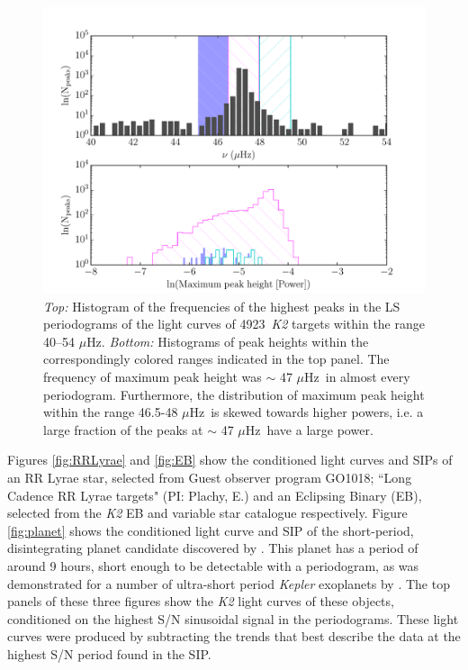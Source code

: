 \documentclass[useAMS, usenatbib, preprint, 12pt]{aastex}
\newcommand{\nGO}{4923}
\newcommand{\uHz}{$\mu$Hz}
\begin{document}
\begin{figure}[h]
\begin{center}
\includegraphics[width=6in, clip=true]{vbg_hist.pdf}
\caption{{\it Top:} Histogram of the frequencies of the highest peaks in the
	LS periodograms of the \citet{Vanderburg2014} light curves of \nGO\
	{\it K2} targets within the range 40--54 \uHz.
	{\it Bottom:} Histograms of peak heights within the correspondingly
	colored ranges indicated in the top panel.
	The frequency of maximum peak height was $\sim$ 47 \uHz\ in almost
	every periodogram.
	Furthermore, the distribution of maximum peak height within the range
	46.5-48 \uHz\ is skewed towards higher powers, i.e. a large fraction of
	the peaks at $\sim$ 47 \uHz\ have a large power.
}
\label{fig:vbg_hist}
\end{center}
\end{figure}

Figures \ref{fig:RRLyrae} and \ref{fig:EB} show the conditioned light curves
and SIPs of an RR Lyrae star, selected from Guest observer program GO1018;
``Long Cadence RR Lyrae targets" (PI: Plachy, E.) and
an Eclipsing Binary (EB), selected from the \citet{Armstrong2015} {\it K2} EB
and variable star catalogue respectively.
Figure \ref{fig:planet} shows the conditioned light curve and SIP of the
short-period, disintegrating planet candidate discovered by
\citet{Sanchis-Ojeda2015}.
This planet has a period of around 9 hours, short enough to be detectable
with a periodogram, as was demonstrated for a number of ultra-short
period {\it Kepler} exoplanets by \citet{Sanchis-Ojeda2014}.
The top panels of these three figures show the {\it K2} light curves of these
objects, conditioned on the highest S/N sinusoidal signal in the
periodograms.
These light curves were produced by subtracting the trends that best describe
the data at the highest S/N period found in the SIP.
\end{document}
